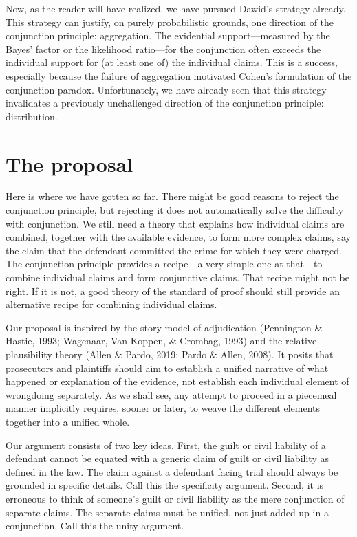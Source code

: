 \documentclass[
  10pt,
  dvipsnames,enabledeprecatedfontcommands]{scrartcl}
\begin{document}
Now, as the reader will have realized, we have pursued Dawid's strategy
already. This strategy can justify, on purely probabilistic grounds, one
direction of the conjunction principle: aggregation. The evidential
support---measured by the Bayes' factor or the likelihood ratio---for
the conjunction often exceeds the individual support for (at least one
of) the individual claims. This is a success, especially because the
failure of aggregation motivated Cohen's formulation of the conjunction
paradox. Unfortunately, we have already seen that this strategy
invalidates a previously unchallenged direction of the conjunction
principle: distribution.

\hypertarget{the-proposal}{%
\section{The proposal}\label{the-proposal}}

\label{sec:proposal}

Here is where we have gotten so far. There might be good reasons to
reject the conjunction principle, but rejecting it does not
automatically solve the difficulty with conjunction. We still need a
theory that explains how individual claims are combined, together with
the available evidence, to form more complex claims, say the claim that
the defendant committed the crime for which they were charged. The
conjunction principle provides a recipe---a very simple one at that---to
combine individual claims and form conjunctive claims. That recipe might
not be right. If it is not, a good theory of the standard of proof
should still provide an alternative recipe for combining individual
claims.

Our proposal is inspired by the story model of adjudication (Pennington
\& Hastie, 1993; Wagenaar, Van Koppen, \& Crombag, 1993) and the
relative plausibility theory (Allen \& Pardo, 2019; Pardo \& Allen,
2008). It posits that prosecutors and plaintiffs should aim to establish
a unified narrative of what happened or explanation of the evidence, not
establish each individual element of wrongdoing separately. As we shall
see, any attempt to proceed in a piecemeal manner implicitly requires,
sooner or later, to weave the different elements together into a unified
whole.

Our argument consists of two key ideas. First, the guilt or civil
liability of a defendant cannot be equated with a generic claim of guilt
or civil liability as defined in the law. The claim against a defendant
facing trial should always be grounded in specific details. Call this
the specificity argument. Second, it is erroneous to think of someone's
guilt or civil liability as the mere conjunction of separate claims. The
separate claims must be unified, not just added up in a conjunction.
Call this the unity argument.
\end{document}
